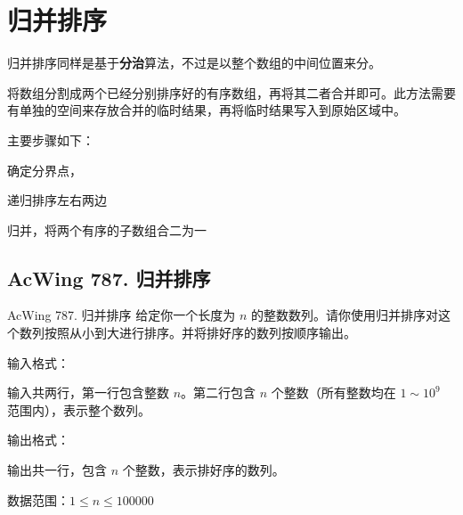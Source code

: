 \section{归并排序}
归并排序同样是基于\textbf{分治}算法，不过是以整个数组的中间位置来分。

将数组分割成两个已经分别排序好的有序数组，再将其二者合并即可。此方法需要有单独的空间来存放合并的临时结果，再将临时结果写入到原始区域中。

主要步骤如下：
\begin{myenum}
    \item 确定分界点， 
    \item 递归排序左右两边
    \item 归并，将两个有序的子数组合二为一
\end{myenum}

\subsection{AcWing 787. 归并排序}
\begin{titledbox}{AcWing 787. 归并排序}
    给定你一个长度为 $n$ 的整数数列。请你使用归并排序对这个数列按照从小到大进行排序。并将排好序的数列按顺序输出。

    输入格式：

    输入共两行，第一行包含整数 $n$。第二行包含 $n$ 个整数（所有整数均在 $1 \sim 10^9$ 范围内），表示整个数列。

    输出格式：

    输出共一行，包含 $n$ 个整数，表示排好序的数列。

    数据范围：$1 \le n \le 100000$

    \begin{inputblock}
         \\
    \end{inputblock}
    \begin{outputblock}
    \end{outputblock}
\end{titledbox}

